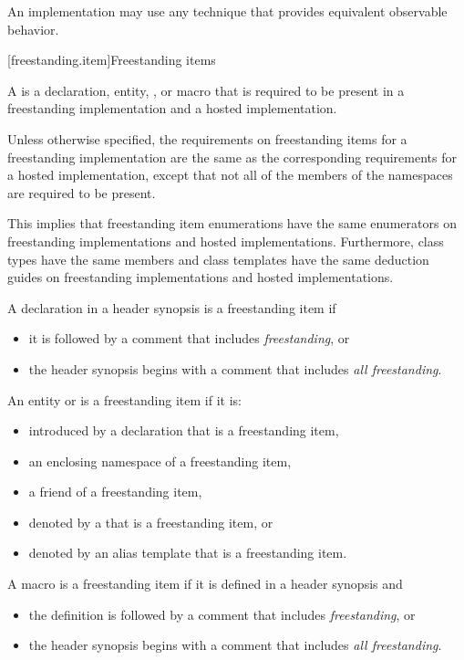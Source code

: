 \pnum
An implementation may use any technique that provides equivalent observable behavior.

[freestanding.item]{Freestanding items}

\pnum
{}%
A  is
a declaration, entity, , or macro
that is required to be present in
a freestanding implementation and a hosted implementation.

\pnum
Unless otherwise specified,
the requirements on freestanding items for a freestanding implementation
are the same as the corresponding requirements for a hosted implementation,
except that not all of the members of the namespaces are required to be present.
\begin{note}
This implies that freestanding item enumerations have the same enumerators on
freestanding implementations and hosted implementations.
Furthermore, class types have the same members and
class templates have the same deduction guides
on freestanding implementations and hosted implementations.
\end{note}

\pnum
{}%
A declaration in a header synopsis is a freestanding item if
\begin{itemize}
\item it is followed by a comment that includes \textit{freestanding}, or
\item the header synopsis begins with a comment that includes \textit{all freestanding}.
\end{itemize}

\pnum
{}%
%
An entity or  is a freestanding item if it is:
\begin{itemize}
\item introduced by a declaration that is a freestanding item,
\item an enclosing namespace of a freestanding item,
\item a friend of a freestanding item,
\item denoted by a  that is a freestanding item, or
\item denoted by an alias template that is a freestanding item.
\end{itemize}

\pnum
{}%
A macro is a freestanding item if it is defined in a header synopsis and
\begin{itemize}
\item the definition is followed by a comment that includes \textit{freestanding}, or
\item the header synopsis begins with a comment that includes \textit{all freestanding}.
\end{itemize}

